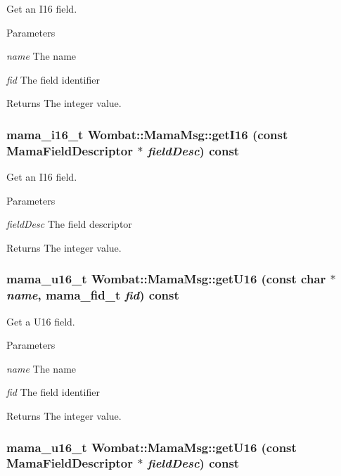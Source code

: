 Get an I16 field. 
\begin{DoxyParams}{Parameters}
\item[{\em name}]The name \item[{\em fid}]The field identifier \end{DoxyParams}
\begin{DoxyReturn}{Returns}
The integer value. 
\end{DoxyReturn}
\hypertarget{classWombat_1_1MamaMsg_ac1935ba284cd4aa19751e273cbb0aebd}{
\subsubsection[{getI16}]{\setlength{\rightskip}{0pt plus 5cm}mama\_\-i16\_\-t Wombat::MamaMsg::getI16 (const {\bf MamaFieldDescriptor} $\ast$ {\em fieldDesc}) const}}
\label{classWombat_1_1MamaMsg_ac1935ba284cd4aa19751e273cbb0aebd}


Get an I16 field. 
\begin{DoxyParams}{Parameters}
\item[{\em fieldDesc}]The field descriptor \end{DoxyParams}
\begin{DoxyReturn}{Returns}
The integer value. 
\end{DoxyReturn}
\hypertarget{classWombat_1_1MamaMsg_a0f12dcdc736320aebb1d7fa11a31ee7d}{
\subsubsection[{getU16}]{\setlength{\rightskip}{0pt plus 5cm}mama\_\-u16\_\-t Wombat::MamaMsg::getU16 (const char $\ast$ {\em name}, \/  mama\_\-fid\_\-t {\em fid}) const}}
\label{classWombat_1_1MamaMsg_a0f12dcdc736320aebb1d7fa11a31ee7d}


Get a U16 field. 
\begin{DoxyParams}{Parameters}
\item[{\em name}]The name \item[{\em fid}]The field identifier \end{DoxyParams}
\begin{DoxyReturn}{Returns}
The integer value. 
\end{DoxyReturn}
\hypertarget{classWombat_1_1MamaMsg_a40b5ef85d72b3dd7f6bab0469a9df918}{
\subsubsection[{getU16}]{\setlength{\rightskip}{0pt plus 5cm}mama\_\-u16\_\-t Wombat::MamaMsg::getU16 (const {\bf MamaFieldDescriptor} $\ast$ {\em fieldDesc}) const}}
\label{classWombat_1_1MamaMsg_a40b5ef85d72b3dd7f6bab0469a9df918}


